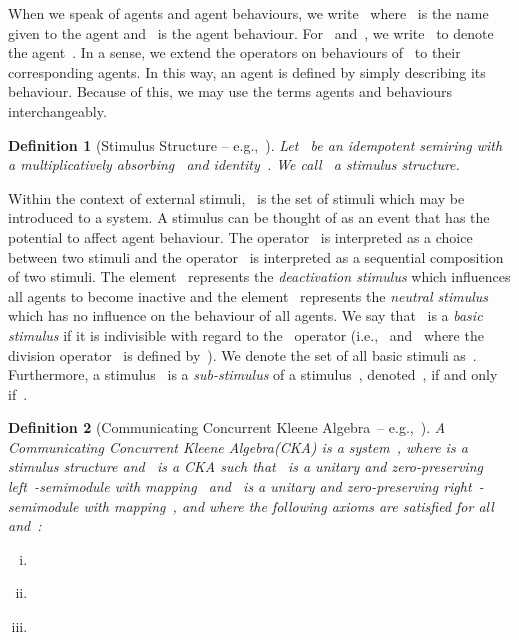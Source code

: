 \documentclass[copyright,creativecommons]{eptcs}
\makeatletter
\newcommand{\eg}{\textrm{e.g.,}\@\xspace}
\newcommand{\ie}{\textrm{i.e.,}\@\xspace}
\newcommand{\CKAabbrv}{CKA\@\xspace}
\newcommand{\cka}{{\cal K}}
\newcommand{\stim}{{\cal S}}
\newcommand{\rightSemimodule}[1]{right~-semimodule\@\xspace}
\newcommand{\leftSemimodule}[1]{left~-semimodule\@\xspace}
\newcommand{\CCKA}{Communicating Concurrent Kleene Algebra\@\xspace}
\newcommand{\CCKAabbrv}{CKA\@\xspace}
\newtheorem{definition}{Definition}
\makeatother
\begin{document}
When we speak of agents and agent behaviours, we write~ where~ is the name given to the agent and~ is the agent behaviour. For~ and~, we write~ to denote the agent~. In a sense, we extend the operators on behaviours of~ to their corresponding agents. In this way, an agent is defined by simply describing its behaviour. Because of this, we may use the terms agents and behaviours interchangeably.

\begin{definition}[Stimulus Structure -- \eg~\cite{Jaskolka2014aa}]
	\label{def:stimulus_structure}
	Let~ be an idempotent semiring with a multiplicatively absorbing~ and identity~. We call~ a \emph{stimulus structure}.
\end{definition}

Within the context of external stimuli,~ is the set of stimuli which may be introduced to a system. A stimulus can be thought of as an event that has the potential to affect agent behaviour. The operator~ is interpreted as a choice between two stimuli and the operator~ is interpreted as a sequential composition of two stimuli. The element~ represents the \emph{deactivation stimulus} which influences all agents to become inactive and the element~ represents the \emph{neutral stimulus} which has no influence on the behaviour of all agents. We say that~ is a \emph{basic stimulus} if it is indivisible with regard to the~ operator (\ie~ and~ where the division operator~ is defined by~). We denote the set of all basic stimuli as~. Furthermore, a stimulus~ is a \emph{sub-stimulus} of a stimulus~, denoted~, if and only if~.

\begin{definition}[\CCKA\ -- \eg~\cite{Jaskolka2014aa}]
	\label{def:C2KA}
	A \emph{\CCKA (\CCKAabbrv)} is a system~, where  is a stimulus structure and~ is a \emph{\CKAabbrv} such that~ is a unitary and zero-preserving \emph{\leftSemimodule{\stim}} with mapping~ and~ is a unitary and zero-preserving \emph{\rightSemimodule{\cka}} with mapping~, and where the following axioms are satisfied for all~ and~:
	\begin{multicols}{2}
	\begin{enumerate}[(i)]
		\item \label{def:cascading_axiom}
			
		\item \label{def:cascading_output_axiom}
			
		\item \label{def:sequential_output_axiom}
			
	\end{enumerate}
	\end{multicols}
\end{definition}
\end{document}
